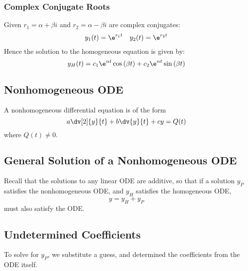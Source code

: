 \documentclass{article}
\begin{document}
\subsubsection{Complex Conjugate Roots}
Given \(r_1 = \alpha + \beta i\) and \(r_2 = \alpha - \beta i\) are complex conjugates:
\begin{align*}
    y_1(t) = \e^{r_1t} &  & y_2(t) = \e^{r_2t}
\end{align*}
Hence the solution to the homogeneous equation is given by:
\begin{equation*}
    y_H(t) = c_1\e^{\alpha t}\cos{\left( \beta t \right)} + c_2\e^{\alpha t}\sin{\left( \beta t \right)}
\end{equation*}
\subsection{Nonhomogeneous ODE}
A nonhomogeneous differential equation is of the form
\begin{equation*}
    a \dv[2]{y}{t} + b \dv{y}{t} + c y = Q(t)
\end{equation*}
where \(Q(t)\neq 0\).
\subsection{General Solution of a Nonhomogeneous ODE}
Recall that the solutions to any linear ODE are additive, so that if a solution \(y_P\) satisfies
the nonhomogeneous ODE, and \(y_H\) satisfies the homogeneous ODE,
\begin{equation*}
    y = y_H + y_P
\end{equation*}
must also satisfy the ODE\@.
\subsection{Undetermined Coefficients}
To solve for \(y_P\), we substitute a guess, and
determined the coefficients from the ODE itself.
\end{document}
